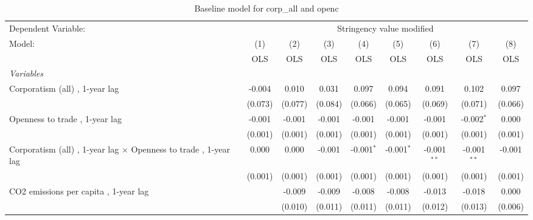 
\begin{table}[htbp]
   \caption{Baseline model for corp\_all and openc}
   \centering
   \begin{tabular}{lcccccccc}
      \toprule
      Dependent Variable: & \multicolumn{8}{c}{Stringency value modified}\\
      Model:                                                                  & (1)     & (2)     & (3)         & (4)           & (5)           & (6)           & (7)           & (8)\\  
                                                                              &  OLS    & OLS     & OLS         & OLS           & OLS           & OLS           & OLS           & OLS\\  
      \midrule
      \emph{Variables}\\
      Corporatism (all) , 1-year lag                                          & -0.004  & 0.010   & 0.031       & 0.097         & 0.094         & 0.091         & 0.102         & 0.097\\   
                                                                              & (0.073) & (0.077) & (0.084)     & (0.066)       & (0.065)       & (0.069)       & (0.071)       & (0.066)\\   
      Openness to trade , 1-year lag                                          & -0.001  & -0.001  & -0.001      & -0.001        & -0.001        & -0.001        & -0.002$^{*}$  & 0.000\\   
                                                                              & (0.001) & (0.001) & (0.001)     & (0.001)       & (0.001)       & (0.001)       & (0.001)       & (0.001)\\   
      Corporatism (all) , 1-year lag $\times$ Openness to trade , 1-year lag  & 0.000   & 0.000   & -0.001      & -0.001$^{*}$  & -0.001$^{*}$  & -0.001$^{**}$ & -0.001$^{**}$ & -0.001\\   
                                                                              & (0.001) & (0.001) & (0.001)     & (0.001)       & (0.001)       & (0.001)       & (0.001)       & (0.001)\\   
      CO2 emissions per capita , 1-year lag                                   &         & -0.009  & -0.009      & -0.008        & -0.008        & -0.013        & -0.018        & 0.000\\   
                                                                              &         & (0.010) & (0.011)     & (0.011)       & (0.011)       & (0.012)       & (0.013)       & (0.006)\\   

\end{tabular}
\end{table}
